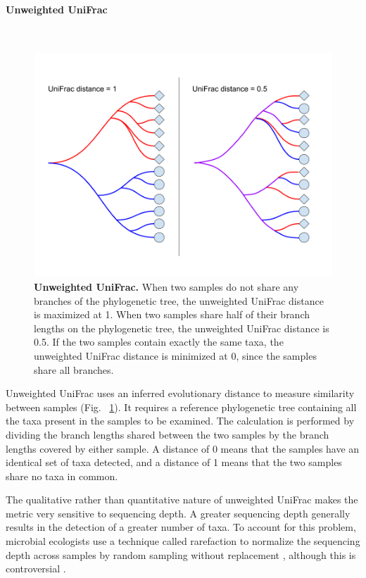 \paragraph{Unweighted UniFrac}\mbox{}\\

\begin{figure}[h]
\begin{center}
\includegraphics[width=\textwidth]{unifrac.png}
\caption[Unweighted UniFrac.]{\textbf{Unweighted UniFrac.} When two samples do not share any branches of the phylogenetic tree, the unweighted UniFrac distance is maximized at 1. When two samples share half of their branch lengths on the phylogenetic tree, the unweighted UniFrac distance is 0.5. If the two samples contain exactly the same taxa, the unweighted UniFrac distance is minimized at 0, since the samples share all branches.}
\label{unweighted_unifrac}
\end{center}
\end{figure}

Unweighted UniFrac uses an inferred evolutionary distance to measure similarity between samples (Fig. ~\ref{unweighted_unifrac}). It requires a reference phylogenetic tree containing all the taxa present in the samples to be examined. The calculation is performed by dividing the branch lengths shared between the two samples by the branch lengths covered by either sample. A distance of 0 means that the samples have an identical set of taxa detected, and a distance of 1 means that the two samples share no taxa in common.

The qualitative rather than quantitative nature of unweighted UniFrac makes the metric very sensitive to sequencing depth. A greater sequencing depth generally results in the detection of a greater number of taxa. To account for this problem, microbial ecologists use a technique called rarefaction to normalize the sequencing depth across samples by random sampling without replacement \cite{de2011evaluation}, although this is controversial \cite{mcmurdie2014waste}.


